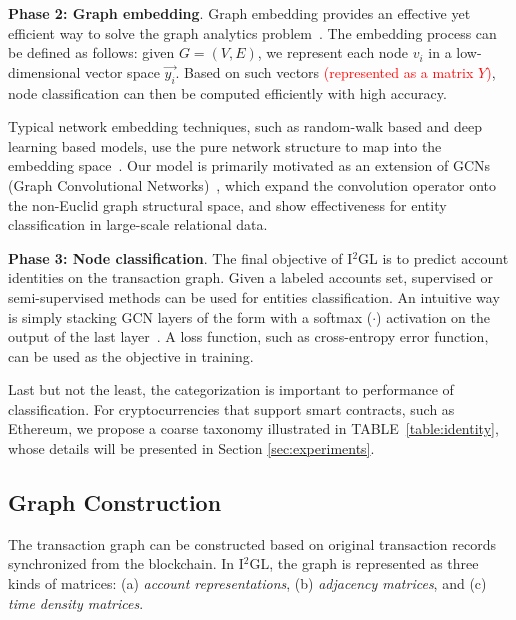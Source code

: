
\textbf{Phase 2: Graph embedding}.
Graph embedding provides an effective yet efficient way to solve the graph analytics problem~\cite{cai2018comprehensive}. The embedding process can be defined as follows: given $G=(V,E)$, we represent each node $v_{i}$ in a low-dimensional vector space $\vec{y_i}$. Based on such vectors \textcolor{red}{(represented as a matrix $Y$)}, node classification can then be computed efficiently with high accuracy.

Typical network embedding techniques, such as random-walk based and deep learning based models, use the pure network structure to map into the embedding space~\cite{goyal2018capturing}. Our model is primarily motivated as an extension of GCNs (Graph Convolutional Networks)~\cite{kipf2016semi,schlichtkrull2018modeling}, which expand the convolution operator onto the non-Euclid graph structural space, and show effectiveness for entity classification in large-scale relational data.

\textbf{Phase 3: Node classification}.
The final objective of I$^2$GL is to predict account identities on the transaction graph. Given a labeled accounts set, supervised or semi-supervised methods can be used for entities classification. An intuitive way is simply stacking GCN layers of the form with a softmax ($\cdot$) activation on the output of the last layer~\cite{schlichtkrull2018modeling}. A loss function, such as cross-entropy error function, can be used as the objective in training.

Last but not the least, the categorization is important to performance of classification. For cryptocurrencies that support smart contracts, such as Ethereum, we propose a coarse taxonomy illustrated in TABLE~\ref{table:identity}, whose details will be presented in Section \ref{sec:experiments}.


\subsection{Graph Construction}
The transaction graph can be constructed based on original transaction records synchronized from the blockchain. In I$^2$GL, the graph is represented as three kinds of matrices: (a) \emph{account representations}, (b) \emph{adjacency matrices}, and (c) \emph{time density matrices}.


